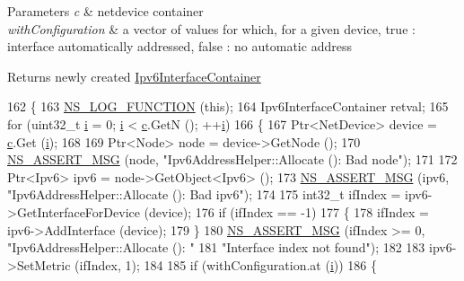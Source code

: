 \begin{DoxyParams}{Parameters}
{\em c} & netdevice container \\
\hline
{\em with\+Configuration} & a vector of values for which, for a given device, true \+: interface automatically addressed, false \+: no automatic address \\
\hline
\end{DoxyParams}
\begin{DoxyReturn}{Returns}
newly created \hyperlink{classns3_1_1Ipv6InterfaceContainer}{Ipv6\+Interface\+Container} 
\end{DoxyReturn}

\begin{DoxyCode}
162 \{
163   \hyperlink{log-macros-disabled_8h_a90b90d5bad1f39cb1b64923ea94c0761}{NS\_LOG\_FUNCTION} (\textcolor{keyword}{this});
164   Ipv6InterfaceContainer retval;
165   \textcolor{keywordflow}{for} (uint32\_t \hyperlink{bernuolliDistribution_8m_a6f6ccfcf58b31cb6412107d9d5281426}{i} = 0; \hyperlink{bernuolliDistribution_8m_a6f6ccfcf58b31cb6412107d9d5281426}{i} < \hyperlink{lte_2model_2fading-traces_2fading__trace__generator_8m_ae0323a9039add2978bf5b49550572c7c}{c}.GetN (); ++\hyperlink{bernuolliDistribution_8m_a6f6ccfcf58b31cb6412107d9d5281426}{i}) 
166     \{
167       Ptr<NetDevice> device = \hyperlink{lte_2model_2fading-traces_2fading__trace__generator_8m_ae0323a9039add2978bf5b49550572c7c}{c}.Get (\hyperlink{bernuolliDistribution_8m_a6f6ccfcf58b31cb6412107d9d5281426}{i});
168 
169       Ptr<Node> node = device->GetNode ();
170       \hyperlink{assert_8h_aff5ece9066c74e681e74999856f08539}{NS\_ASSERT\_MSG} (node, \textcolor{stringliteral}{"Ipv6AddressHelper::Allocate (): Bad node"});
171 
172       Ptr<Ipv6> ipv6 = node->GetObject<Ipv6> ();
173       \hyperlink{assert_8h_aff5ece9066c74e681e74999856f08539}{NS\_ASSERT\_MSG} (ipv6, \textcolor{stringliteral}{"Ipv6AddressHelper::Allocate (): Bad ipv6"});
174 
175       int32\_t ifIndex = ipv6->GetInterfaceForDevice (device);
176       \textcolor{keywordflow}{if} (ifIndex == -1)
177         \{
178           ifIndex = ipv6->AddInterface (device);
179         \}
180       \hyperlink{assert_8h_aff5ece9066c74e681e74999856f08539}{NS\_ASSERT\_MSG} (ifIndex >= 0, \textcolor{stringliteral}{"Ipv6AddressHelper::Allocate (): "}
181                      \textcolor{stringliteral}{"Interface index not found"});
182 
183       ipv6->SetMetric (ifIndex, 1);
184 
185       \textcolor{keywordflow}{if} (withConfiguration.at (\hyperlink{bernuolliDistribution_8m_a6f6ccfcf58b31cb6412107d9d5281426}{i}))
186         \{

\end{DoxyCode}
